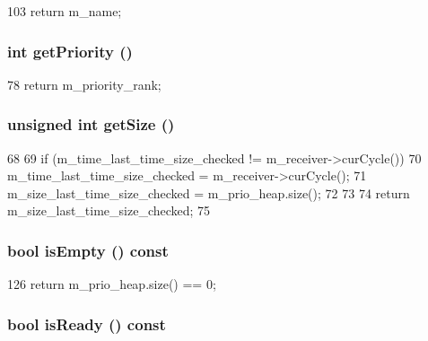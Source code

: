 \begin{DoxyCode}
103 { return m_name;}
\end{DoxyCode}
\hypertarget{classMessageBuffer_a8e1ac3494e27c30441640926f0f07b6f}{
\subsubsection[{getPriority}]{\setlength{\rightskip}{0pt plus 5cm}int getPriority ()}}
\label{classMessageBuffer_a8e1ac3494e27c30441640926f0f07b6f}



\begin{DoxyCode}
78 { return m_priority_rank; }
\end{DoxyCode}
\hypertarget{classMessageBuffer_a5301d277181ca5f033a81035ff20c76b}{
\subsubsection[{getSize}]{\setlength{\rightskip}{0pt plus 5cm}unsigned int getSize ()}}
\label{classMessageBuffer_a5301d277181ca5f033a81035ff20c76b}



\begin{DoxyCode}
68 {
69     if (m_time_last_time_size_checked != m_receiver->curCycle()) {
70         m_time_last_time_size_checked = m_receiver->curCycle();
71         m_size_last_time_size_checked = m_prio_heap.size();
72     }
73 
74     return m_size_last_time_size_checked;
75 }
\end{DoxyCode}
\hypertarget{classMessageBuffer_a479432127ee77145cc19d6a2d1590821}{
\subsubsection[{isEmpty}]{\setlength{\rightskip}{0pt plus 5cm}bool isEmpty () const}}
\label{classMessageBuffer_a479432127ee77145cc19d6a2d1590821}



\begin{DoxyCode}
126 { return m_prio_heap.size() == 0; }
\end{DoxyCode}
\hypertarget{classMessageBuffer_ac12eec09d47a89a1ddf3eb6bb19b5bd3}{
\subsubsection[{isReady}]{\setlength{\rightskip}{0pt plus 5cm}bool isReady () const}}
\label{classMessageBuffer_ac12eec09d47a89a1ddf3eb6bb19b5bd3}



